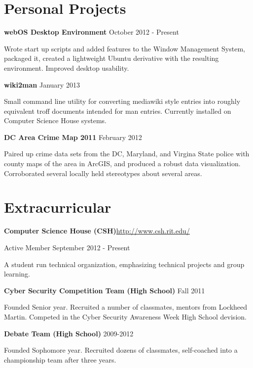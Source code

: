 \documentclass[letter,margin,line]{resume}
\newcommand{\rurl}[1]{\hfill {\footnotesize \url{#1}}}
\begin{document}
\begin{resume}
\section{\mysidestyle Personal Projects}
	\begin{asparablank}
		\item {\bf webOS Desktop Environment} \hfill October 2012 - Present
		
		\small Wrote start up scripts and added features to the Window Management System, packaged it, created a lightweight Ubuntu derivative with the resulting environment. Improved desktop usability.  
		\normalsize
		\\
		
		\item {\bf wiki2man} \hfill January 2013
		
		\small Small command line utility for converting mediawiki style entries into roughly equivalent troff documents intended for man entries. Currently installed on Computer Science House systems.
		\normalsize
		\\
		
		\item {\bf DC Area Crime Map 2011} \hfill February 2012
		
		\small Paired up crime data sets from the DC, Maryland, and Virgina State police with county maps of the area in ArcGIS, and produced a robust data visualization. Corroborated several locally held stereotypes about several areas.
		\normalsize
		\\
	\end{asparablank}

\section{\mysidestyle Extracurricular}
	\begin{asparablank}
		\item {\bf Computer Science House ({\small CSH})}\rurl{http://www.csh.rit.edu/}
		\small	\item Active Member \hfill September 2012 - Present
				\item A student run technical organization, emphasizing technical projects and group learning. 
		\\
		\item {\bf Cyber Security Competition Team ({\small High School})} \hfill Fall 2011
		\small \item Founded Senior year. Recruited a number of classmates, mentors from Lockheed Martin. Competed in the Cyber Security Awareness Week High School devision. 
		\\
		\item {\bf Debate Team ({\small High School})} \hfill 2009-2012
		\small \item Founded Sophomore year. Recruited dozens of classmates, self-coached into a championship team after three years.
	\end{asparablank}

\end{resume}
\end{document}
